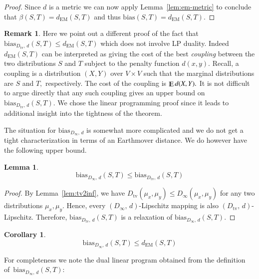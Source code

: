 \documentclass[letterpaper,11pt]{article}
\newtheorem{corollary}[theorem]{Corollary}
\newtheorem{lemma}[theorem]{Lemma}%
\theoremstyle{definition}
\newtheorem{remark}{Remark}[section]
\renewcommand{\mathbb}{\varmathbb}
\newcommand{\Esymb}{\mathbb{E}}
\DeclareMathOperator*{\E}{\Esymb}
\newcommand{\tv}{\mathrm{tv}}
\newcommand\bias{\mathrm{bias}}
\newcommand\EM{\mathrm{EM}}
\newcommand\dtoDtv{D_\tv,\, d}
\newcommand\dtoDinfty{D_\infty,\, d}
\begin{document}
\begin{proof}
Since $d$ is a metric we can now apply Lemma~\ref{lem:em-metric} to conclude
that $\beta(S,T)=d_\EM(S,T)$ and thus $\bias(S,T)=d_\EM(S,T).$
\end{proof}

\begin{remark}
Here we point out a different proof of the fact that
$\bias_{\dtoDtv}(S,T)\le d_\EM(S,T)$ which does not
involve LP duality. Indeed $d_\EM(S,T)$ can be interpreted as giving the
cost of the best \emph{coupling} between the two distributions $S$ and $T$
subject to the penalty function $d(x,y).$ Recall, a coupling is a distribution
$(X,Y)$ over $V\times V$ such that the marginal distributions are $S$ and $T,$
respectively. The cost of the coupling is $\E d(X,Y).$
It is not difficult to argue directly that any such coupling gives an upper
bound on $\bias_{\dtoDtv}(S,T).$ We chose the linear programming proof
since it leads to additional insight into the tightness of the theorem.
\end{remark}

The situation for $\bias_{\dtoDinfty}$ is somewhat more complicated and we
do not get a tight characterization in terms of an Earthmover distance. We do
however have the following upper bound.
%
\begin{lemma}
\begin{equation}
\bias_{\dtoDinfty}(S,T)\le \bias_{\dtoDtv}(S,T)
\end{equation}
\end{lemma}
\begin{proof}
By Lemma~\ref{lem:tv2inf}, we have $D_\tv(\mu_x,\mu_y)\le
D_\infty(\mu_x,\mu_y)$ for any two distributions $\mu_x,\mu_y.$
Hence, every $(\dtoDinfty)$-Lipschitz mapping is
also $(\dtoDtv)$-Lipschitz. Therefore, $\bias_{\dtoDtv}(S,T)$ is a
relaxation of $\bias_{\dtoDinfty}(S,T).$
\end{proof}
%
\begin{corollary}
\begin{equation}
\bias_{\dtoDinfty}(S,T)\le d_\EM(S,T)
\end{equation}
\end{corollary}
For completeness we note the dual linear program obtained from the definition
of~$\bias_{\dtoDinfty}(S,T):$
\end{document}
